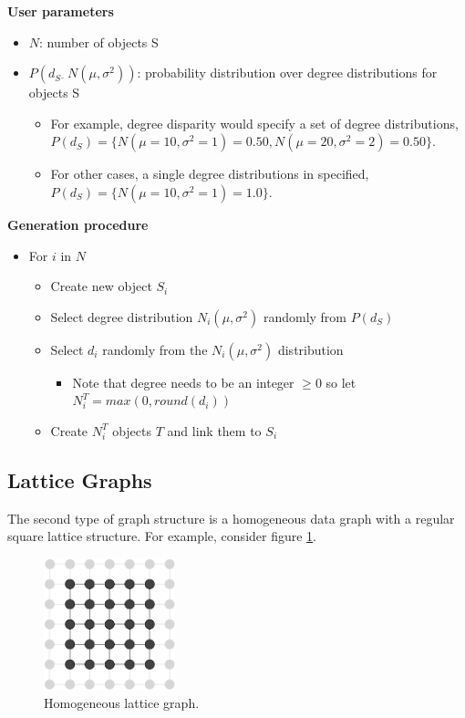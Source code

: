 \documentclass[11pt]{article}
\begin{document}
\small{
\textbf{User parameters}
\vspace{-5.mm}
\begin{itemize}
\item $N$: number of objects S
\item $P(d_S \: {}_{\widetilde{}} \: N(\mu,\sigma^2))$: probability distribution over degree distributions for objects S
\begin{itemize}
\item For example, degree disparity would specify a set of degree distributions, $P(d_S) = \{N(\mu=10,\sigma^2=1)=0.50, N(\mu=20,\sigma^2=2)=0.50 \}$.
\item For other cases, a single degree distributions in specified, $P(d_S) = \{N(\mu=10,\sigma^2=1)=1.0 \}$.
\end{itemize}
\end{itemize}
}

\small{
\textbf{Generation procedure}
\vspace{-5.mm}
\begin{itemize}
\item For $i$ in $N$
\begin{itemize}
\item Create new object $S_i$
\item Select degree distribution $N_i(\mu, \sigma^2)$ randomly from $P(d_S)$ 
\item Select $d_i$ randomly from the $N_i(\mu, \sigma^2)$ distribution 
	\begin{itemize}
	\item Note that degree needs to be an integer $\geq 0$ so let  $N_i^T=max(0, round(d_i))$ 
	\end{itemize}
\item Create $N_i^T$ objects $T$ and link them to $S_i$
\end{itemize}
\end{itemize}
}

\vspace{-2.mm}
\subsection*{Lattice Graphs}
\vspace{-4.mm}
The second type of graph structure is a homogeneous data graph with a regular square lattice structure. For example, consider figure \ref{lattice}. 
\begin{figure}[ht] 
	\begin{center}
	\includegraphics[width=1.5in]{./graphics/lattice}
	\end{center} \vspace{-6.mm}
	\caption{ \label{lattice} Homogeneous lattice graph.} 
\end{figure} 
\end{document}
